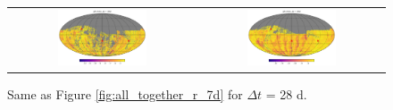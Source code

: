 \documentclass[preprintm,linenumbers]{aastex631}
\begin{document}
\begin{figure}
\begin{tabular}{c c}
         \includegraphics[width=0.5\textwidth]{results/skymaps_cutout/skymaps_cutout_delta_first_year_one_snap_v4_0_10yrs_db_noDD_noTwi_tscale-28_nside-256_doAllTemplateMetrics_reduceCount_g_noDD_noTwi.pdf} &
         \includegraphics[width=0.5\textwidth]{results/skymaps_cutout/skymaps_cutout_delta_first_year_one_snap_v4_0_10yrs_db_noDD_noTwi_tscale-28_nside-256_doAllTemplateMetrics_reduceCount_r_noDD_noTwi.pdf} \\

   \end{tabular}

        \caption{
        Same as Figure \ref{fig:all_together_r_7d} for $\Delta t$ = 28 d. 
        }
        \label{fig:all_together_r_28d}
	\end{figure}

  
\end{document}
